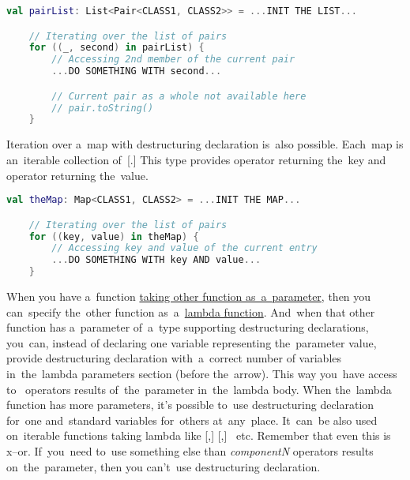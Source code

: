 \begin{lstlisting}[language=Kotlin]
    val pairList: List<Pair<CLASS1, CLASS2>> = ...INIT THE LIST...

    // Iterating over the list of pairs
    for ((_, second) in pairList) {
        // Accessing 2nd member of the current pair
        ...DO SOMETHING WITH second...

        // Current pair as a whole not available here
        // pair.toString()
    }
\end{lstlisting}
\newline

\noindent Iteration over a~map with destructuring declaration is~also possible.
Each~map is an~iterable collection of~[.]
This type provides  operator returning the~key and~ operator returning the~value.

\begin{lstlisting}[language=Kotlin]
    val theMap: Map<CLASS1, CLASS2> = ...INIT THE MAP...

    // Iterating over the list of pairs
    for ((key, value) in theMap) {
        // Accessing key and value of the current entry
        ...DO SOMETHING WITH key AND value...
    }
\end{lstlisting}

When you have a~function \hyperref[kotlinanonymousfunction]{taking other function as~a~parameter}, then you can~specify the~other function as~a~\hyperref[kotlinlambda]{lambda function}.
And~when that other function has a~parameter of~a~type supporting destructuring declarations, you~can, instead of declaring one variable representing the~parameter value, provide destructuring declaration with~a~correct number of variables in~the~lambda parameters section (before the~arrow).
This way you~have access to~ operators results of~the~parameter in~the~lambda body.
When the~lambda function has more parameters, it's possible to~use destructuring declaration for~one and~standard variables for~others at~any~place.
It~can~be also used on~iterable functions taking lambda like [,] [,] ~etc.
Remember that even this is x--or.
If~you~need to~use something else than \textit{componentN} operators results on~the~parameter, then you can't~use destructuring declaration.

